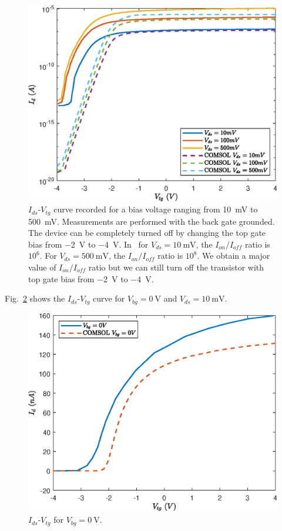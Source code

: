 \documentclass[12pt,a4paper,titlepage]{article}
\begin{document}
\begin{figure}[H]
	\centering
	\includegraphics[width=.8\textwidth]{Grafici/Id(Vtg)_HfO2_MoS2_varying_Vds.eps} 
	\caption{$I_{ds}$-$V_{tg}$ curve recorded for a bias voltage ranging from \SI{10}{\milli \volt} to \SI{500}{\milli \volt}. Measurements are performed with the back gate grounded. The device can be completely turned off by changing the top gate bias from \SI{-2}{ \volt} to \SI{-4}{\volt}. In~\cite{Radisavljevic:Si_MoS2} for $V_{ds} = \SI{10}{\milli \volt}$, the $I_{on}/I_{off}$ ratio is $10^6$. For $V_{ds} = \SI{500}{\milli \volt}$, the $I_{on}/I_{off}$ ratio is $10^8$. We obtain a major value of $I_{on}/I_{off}$ ratio but we can still turn off the transistor with top gate bias from \SI{-2}{ \volt} to \SI{-4}{\volt}.}
	\label{fig:Id(Vtg)_HfO2_MoS2_varying_Vds}
\end{figure}

Fig.~\ref{fig:Id(Vtg)_HfO2_MoS2_varying_Vbg} shows the $I_{ds}$-$V_{tg}$ curve for $V_{bg}=\SI{0}{\volt}$ and $V_{ds}=\SI{10}{\milli \volt}$.

\begin{figure}[H]
	\centering
	\includegraphics[width=.7\textwidth]{Grafici/Id(Vtg)_HfO2_MoS2_varying_Vbg.eps} 
	\caption{$I_{ds}$-$V_{tg}$ for $V_{bg} = \SI{0}{\volt}$.}
	\label{fig:Id(Vtg)_HfO2_MoS2_varying_Vbg}
\end{figure}
\end{document}
